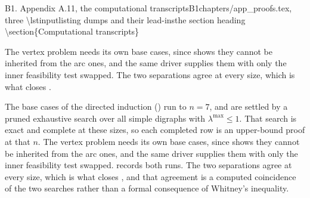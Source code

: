 \begin{offcutrewrite}{B1. Appendix A.11, the computational transcripts}{B1}{chapters/app\_proofs.tex, three \textbackslash{}lstinputlisting dumps and their lead-ins}{the section heading \textbackslash{}section\{Computational transcripts\}}


The vertex problem needs its own base cases, since  shows they cannot be inherited from the arc ones, and the same driver supplies them with only the inner feasibility test swapped. The two separations agree at every size, which is what closes .


\nowreads
The base cases of the directed induction () run to $n = 7$, and are settled by a pruned exhaustive search over all simple digraphs with $\lambda^{\max} \le 1$. That search is exact and complete at these sizes, so each completed row is an upper-bound proof at that $n$. The vertex problem needs its own base cases, since  shows they cannot be inherited from the arc ones, and the same driver supplies them with only the inner feasibility test swapped.  records both runs. The two separations agree at every size, which is what closes , and that agreement is a computed coincidence of the two searches rather than a formal consequence of Whitney's inequality.


\end{offcutrewrite}
